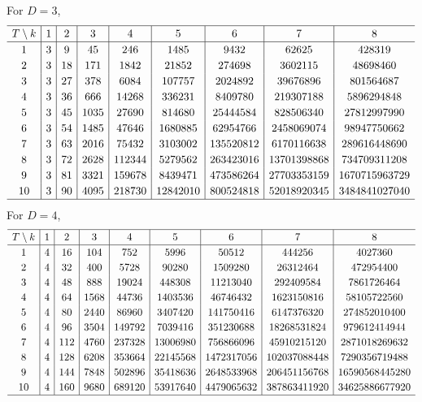 \documentclass[pdftex]{sigma}
\numberwithin{equation}{section}
\begin{document}
For $D=3$,
\begin{gather*}
\setlength{\tabcolsep}{4.5pt}
\renewcommand{\arraystretch}{1.2}
\begin{tabular}{c|c|c|c|c|c|c|c|c}
\hline $T\setminus k$&1&2&3&4&5&6&7&8\\ \hline
1&3& 9& 45& 246& 1485& 9432& 62625& 428319\\
 2&3& 18& 171& 1842& 21852& 274698& 3602115& 48698460\\
 3&3& 27& 378& 6084& 107757& 2024892& 39676896& 801564687\\
 4&3& 36& 666& 14268& 336231& 8409780& 219307188& 5896294848\\
 5&3& 45& 1035& 27690& 814680& 25444584& 828506340& 27812997990\\
 6&3& 54& 1485& 47646& 1680885& 62954766& 2458069074& 98947750662\\
 7&3& 63& 2016& 75432& 3103002& 135520812& 6170116638& 289616448690\\
 8&3& 72& 2628& 112344& 5279562& 263423016& 13701398868& 734709311208\\
 9&3& 81& 3321& 159678& 8439471& 473586264& 27703353159& 1670715963729\\
 10&3& 90& 4095& 218730& 12842010& 800524818& 52018920345& 3484841027040\\
\hline
\end{tabular}
\end{gather*}
For $D=4$,
\begin{gather*}
\setlength{\tabcolsep}{4.5pt}
\renewcommand{\arraystretch}{1.2}
\begin{tabular}{c|c|c|c|c|c|c|c|c}
\hline $T\setminus k$&1&2&3&4&5&6&7&8\\ \hline
 1&4& 16& 104& 752& 5996& 50512& 444256& 4027360\\
 2&4& 32& 400& 5728& 90280& 1509280& 26312464& 472954400\\
 3&4& 48& 888& 19024& 448308& 11213040& 292409584& 7861726464\\
4&4& 64& 1568& 44736& 1403536& 46746432& 1623150816& 58105722560\\
5&4& 80& 2440& 86960& 3407420& 141750416& 6147376320& 274852010400\\
6&4& 96& 3504& 149792& 7039416& 351230688& 18268531824& 979612414944\\
7&4& 112& 4760& 237328& 13006980& 756866096& 45910215120& 2871018269632\\
8&4& 128& 6208& 353664& 22145568& 1472317056& 102037088448& 7290356719488\\
9&4& 144& 7848& 502896& 35418636& 2648533968& 206451156768& 16590568445280\\
10&4& 160& 9680& 689120& 53917640& 4479065632& 387863411920& 34625886677920\\
\hline
\end{tabular}
\end{gather*}
\end{document}
